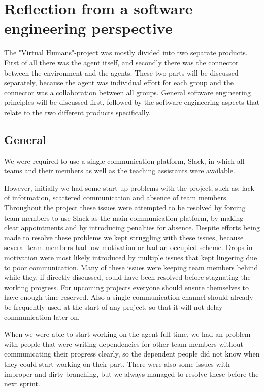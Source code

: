\chapter[Reflection from a software engineering perspective]{Reflection from a software \\ engineering perspective}
\label{chap:Reflection from a software engineering perspective}

The "Virtual Humans"-project was mostly divided into two separate products.
First of all there was the agent itself, and secondly there was the connector between the environment and the agents.
These two parts will be discussed separately, because the agent was individual effort for each group and the connector was a collaboration between all groups. General software engineering principles will be discussed first,
followed by the software engineering aspects that relate to the two different products specifically.

\section{General}
\label{sec:General}
We were required to use a single communication platform, Slack, in which all teams and their members as well as the teaching assistants were available. 

However, initially we had some start up problems with the project, such as: lack of information, scattered communication and absence of team members. Throughout the project these issues were attempted to be resolved by forcing team members to use Slack as the main communication platform, by making clear appointments and by introducing penalties for absence. Despite efforts being made to resolve these problems we kept struggling with these issues, because several team members had low motivation or had an occupied scheme. Drops in motivation were most likely introduced by multiple issues that kept lingering due to poor communication. Many of these issues were keeping team members behind while they, if directly discussed, could have been resolved before stagnating the working progress. 
For upcoming projects everyone should ensure themselves to have enough time reserved. Also a single communication channel should already be frequently used at the start of any project, so that it will not delay communication later on. 

When we were able to start working on the agent full-time, we had an problem with people that were writing dependencies for other team members without communicating their progress clearly, so the dependent people did not know when they could start working on their part. There were also some issues with improper and dirty branching, but we always managed to resolve these before the next sprint. 

